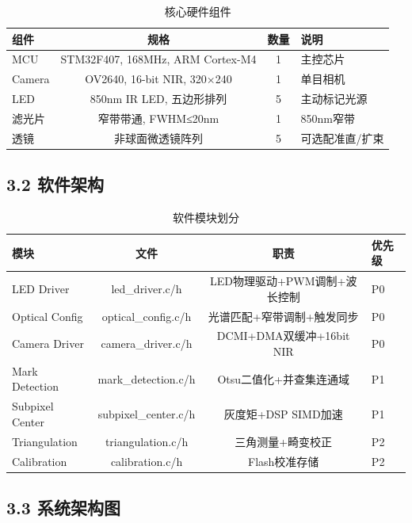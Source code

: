 \documentclass[12pt,a4paper]{article}
\begin{document}
\begin{table}[H]
\centering
\caption{核心硬件组件}
\begin{tabular}{lccl}
\toprule
组件 & 规格 & 数量 & 说明 \\
\midrule
MCU & STM32F407, 168MHz, ARM Cortex-M4 & 1 & 主控芯片 \\
Camera & OV2640, 16-bit NIR, 320×240 & 1 & 单目相机 \\
LED & 850nm IR LED, 五边形排列 & 5 & 主动标记光源 \\
滤光片 & 窄带带通, FWHM≤20nm & 1 & 850nm窄带 \\
透镜 & 非球面微透镜阵列 & 5 & 可选配准直/扩束 \\
\bottomrule
\end{tabular}
\end{table}

\subsection{3.2 软件架构}

\begin{table}[H]
\centering
\caption{软件模块划分}
\begin{tabular}{lccl}
\toprule
模块 & 文件 & 职责 & 优先级 \\
\midrule
LED Driver & led\_driver.c/h & LED物理驱动+PWM调制+波长控制 & P0 \\
Optical Config & optical\_config.c/h & 光谱匹配+窄带调制+触发同步 & P0 \\
Camera Driver & camera\_driver.c/h & DCMI+DMA双缓冲+16bit NIR & P0 \\
Mark Detection & mark\_detection.c/h & Otsu二值化+并查集连通域 & P1 \\
Subpixel Center & subpixel\_center.c/h & 灰度矩+DSP SIMD加速 & P1 \\
Triangulation & triangulation.c/h & 三角测量+畸变校正 & P2 \\
Calibration & calibration.c/h & Flash校准存储 & P2 \\
\bottomrule
\end{tabular}
\end{table}

\subsection{3.3 系统架构图}
\end{document}
